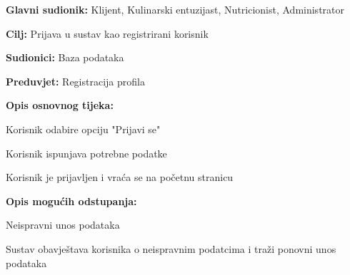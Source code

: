 					\noindent {}
					\begin{packed_item}
	
						\item \textbf{Glavni sudionik: } Klijent, Kulinarski entuzijast, Nutricionist, Administrator
						\item  \textbf{Cilj:} Prijava u sustav kao registrirani korisnik
						\item  \textbf{Sudionici:} Baza podataka
						\item  \textbf{Preduvjet:} Registracija profila
						\item  \textbf{Opis osnovnog tijeka:} 
						
						\item[] \begin{packed_enum}
	
							\item Korisnik odabire opciju "Prijavi se"
							\item Korisnik ispunjava potrebne podatke
							\item Korisnik je prijavljen i vraća se na početnu stranicu
						\end{packed_enum}
						
						\item  \textbf{Opis mogućih odstupanja:}
						
						\item[] \begin{packed_item}
	
							\item[2.a] Neispravni unos podataka
							\item[] \begin{packed_enum}
								
								\item Sustav obavještava korisnika o neispravnim podatcima i traži ponovni unos podataka
								
							\end{packed_enum}

						\end{packed_item}
					\end{packed_item}


